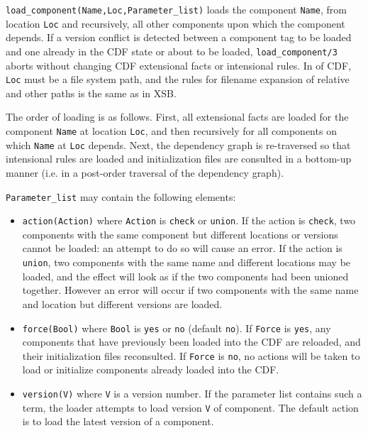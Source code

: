 \begin{description}
{\tt load\_component(Name,Loc,Parameter\_list)} loads the component
{\tt Name}, from location {\tt Loc} and recursively, all other
components upon which the component depends.  If a version conflict is
detected between a component tag to be loaded and one already in the
CDF state or about to be loaded, {\tt load\_component/3} aborts
without changing CDF extensional facts or intensional rules.  In
\version{} of CDF, {\tt Loc} must be a file system path, and the rules
for filename expansion of relative and other paths is the same as in
XSB.

The order of loading is as follows.  First, all extensional facts are
loaded for the component {\tt Name} at location {\tt Loc}, and then
recursively for all components on which {\tt Name} at {\tt Loc}
depends.  Next, the dependency graph is re-traversed so that
intensional rules are loaded and initialization files are consulted in
a bottom-up manner (i.e. in a post-order traversal of the dependency
graph).

{\tt Parameter\_list} may contain the following elements:
\begin{itemize}

\item {\tt action(Action)} where {\tt Action} is {\tt check} or
{\tt union}.  If the action is {\tt check}, two components with the
same component but different locations or versions cannot be loaded:
an attempt to do so will cause an error.  If the action is {\tt
union}, two components with the same name and different locations may
be loaded, and the effect will look as if the two components had been
unioned together.  However an error will occur if two components with
the same name and location but different versions are loaded.

\item {\tt force(Bool)} where {\tt Bool} is {\tt yes} or {\tt no} (default
{\tt no}).  If {\tt Force} is {\tt yes}, any components that have
previously been loaded into the CDF are reloaded, and their
initialization files reconsulted.  If {\tt Force} is {\tt no}, no
actions will be taken to load or initialize components already loaded
into the CDF.

\item {\tt version(V)} where {\tt V} is a version number.  If the
parameter list contains such a term, the loader attempts to load
version {\tt V} of component.  The default action is to load the latest
version of a component.
\end{itemize}


\end{description}
